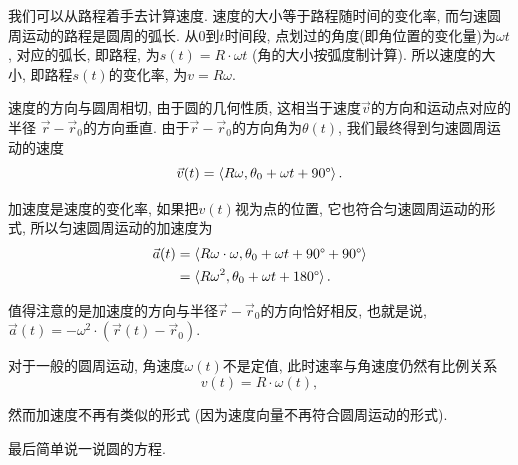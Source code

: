 我们可以从路程着手去计算速度.
速度的大小等于路程随时间的变化率,
而匀速圆周运动的路程是圆周的弧长.
从0到$t$时间段, 点划过的角度(即角位置的变化量)为$\omega t$,
对应的弧长, 即路程, 为$s(t) = R\cdot\omega t$ (角的大小按弧度制计算).
所以速度的大小, 即路程$s(t)$的变化率, 为$v = R\omega$.

\begin{center}
  \hspace{0.2\textwidth}
\end{center}

速度的方向与圆周相切, 由于圆的几何性质,
这相当于速度$\vec v$的方向和运动点对应的半径
$\vec r-\vec r_0$的方向垂直.
由于$\vec r-\vec r_0$的方向角为$\theta(t)$,
我们最终得到匀速圆周运动的速度
\[
  \vec v(t) = \braket{R\omega, \theta_0+\omega t+90\degree}.
\]

加速度是速度的变化率, 如果把$v(t)$视为点的位置,
它也符合匀速圆周运动的形式, 所以匀速圆周运动的加速度为
\begin{align*}
  \vec a(t) & = \braket{R\omega\cdot\omega,
  \theta_0+\omega t+90\degree+90\degree}    \\
            & = \braket{R\omega^2,
    \theta_0+\omega t+180\degree}.
\end{align*}

值得注意的是加速度的方向与半径$\vec r-\vec r_0$的方向恰好相反,
也就是说, $\vec a(t) = -\omega^2 \cdot (\vec r(t) - \vec r_0)$.

对于一般的圆周运动, 角速度$\omega(t)$不是定值,
此时速率与角速度仍然有比例关系
\[v(t) = R\cdot\omega(t),\]

然而加速度不再有类似的形式 (因为速度向量不再符合圆周运动的形式).

\hlinefill

最后简单说一说圆的方程.

